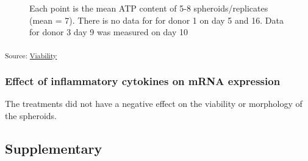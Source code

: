 \documentclass[
  letterpaper,
  DIV=11,
  numbers=noendperiod,
  oneside]{scrartcl}
\begin{document}
\begin{figure}[H]


\caption{\label{fig-viability-absolute-overall}Each point is the mean
ATP content of 5-8 spheroids/replicates (mean = 7). There is no data for
for donor 1 on day 5 and 16. Data for donor 3 day 9 was measured on day
10}

\end{figure}%

\textsubscript{Source:
\href{https://andreasludvig.github.io/manuscript/notebooks/viability/Viability-preview.html\#cell-fig-viability-absolute-overall}{Viability}}

\subsubsection{Effect of inflammatory cytokines on mRNA
expression}\label{effect-of-inflammatory-cytokines-on-mrna-expression}

The treatments did not have a negative effect on the viability or
morphology of the spheroids.

\subsection{Supplementary}\label{supplementary}
\end{document}
